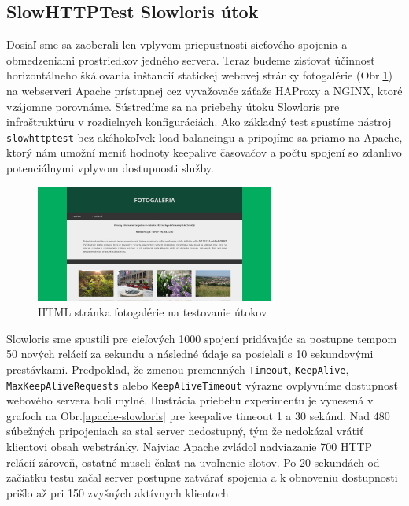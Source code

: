 \documentclass[12pt, a4paper]{article}
\begin{document}
\subsection{SlowHTTPTest Slowloris útok}
Dosiaľ sme sa zaoberali len vplyvom priepustnosti sieťového spojenia a obmedzeniami prostriedkov jedného
servera. Teraz budeme zisťovať účinnosť horizontálneho škálovania inštancií statickej webovej stránky 
fotogalérie (Obr.\ref{gallery-website}) na webserveri Apache prístupnej cez vyvažovače záťaže HAProxy a NGINX, 
ktoré vzájomne porovnáme. Sústredíme sa na priebehy útoku Slowloris pre infraštruktúru v rozdielnych 
konfiguráciách. Ako základný test spustíme nástroj \verb|slowhttptest| bez akéhokoľvek load balancingu
a pripojíme sa priamo na Apache, ktorý nám umožní meniť hodnoty keepalive časovačov a počtu spojení so 
zdanlivo potenciálnymi vplyvom dostupnosti služby.

\begin{figure}[h!]
	\centering
  	\includegraphics[width=0.7\textwidth]{images/website.png}
  	\caption{HTML stránka fotogalérie na testovanie útokov}
  	\label{gallery-website}
\end{figure}

Slowloris sme spustili pre cieľových 1000 spojení pridávajúc sa postupne tempom 50 nových relácií za sekundu
a následné údaje sa posielali s 10 sekundovými prestávkami. Predpoklad, že zmenou premenných \verb|Timeout|,
\verb|KeepAlive|, \verb|MaxKeepAliveRequests| alebo \verb|KeepAliveTimeout| výrazne ovplyvníme dostupnosť
webového servera boli mylné. Ilustrácia priebehu experimentu je vynesená v grafoch na 
Obr.\ref{apache-slowloris} pre keepalive timeout 1 a 30 sekúnd. Nad 480 súbežných pripojeniach sa stal
server nedostupný, tým že nedokázal vrátiť klientovi obsah webstránky. Najviac Apache zvládol nadviazanie
700 HTTP relácií zároveň, ostatné museli čakať na uvoľnenie slotov. Po 20 sekundách od začiatku testu
začal server postupne zatvárať spojenia a k obnoveniu dostupnosti prišlo až pri 150 zvyšných aktívnych
klientoch.
\end{document}

